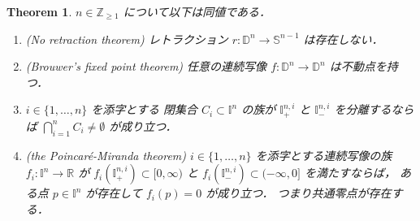 \documentclass[leqno, a4paper, 12pt]{jsarticle}
\theoremstyle{plain}
\newtheorem{thm}{Theorem}[section]
\theoremstyle{definition}
\theoremstyle{remark}
\newcommand{\zz}{\mathbb{Z}}
\newcommand{\rr}{\mathbb{R}}
\newcommand{\yospfont}[1]{\mathbb{#1}}
\newcommand{\yodisc}[1]{\yospfont{D}^{#1}}
\newcommand{\yosphere}[1]{\yospfont{S}^{#1}}
\newcommand{\yocube}[1]{\yospfont{I}^{#1}}
\newcommand{\yocubesidep}[2]{\yospfont{I}^{#1, #2}_{+}}
\newcommand{\yocubesidem}[2]{\yospfont{I}^{#1, #2}_{-}}
\numberwithin{equation}{section}
\begin{document}
\begin{thm}\label{thm:sum:douchifixedpoint}
$n\in \zz_{\ge 1}$
について以下は同値である．
\begin{enumerate}[label=\textup{(\arabic*)}]

\item\label{item:noret}(No retraction theorem)
レトラクション
$r\colon \yodisc{n}\to \yosphere{n-1}$
は存在しない．

\item\label{item:fixedpt}(Brouwer's fixed point theorem)
任意の連続写像
$f\colon \yodisc{n}\to \yodisc{n}$
は不動点を持つ．

\item\label{item:ccc}
$i\in \{1, \dots, n\}$
を添字とする
閉集合
$C_{i}\subset \yocube{n}$
の族が
$\yocubesidep{n}{i}$
と
$\yocubesidem{n}{i}$
を分離するならば
$\bigcap_{i=1}^{n}C_{i}\neq \emptyset$
が成り立つ．


\item\label{item:pm}(the Poincar\'{e}-Miranda theorem)
$i\in \{1, \dots, n\}$
を添字とする連続写像の族
$f_{i}\colon \yocube{n}\to \rr$
が
$f_{i}(\yocubesidep{n}{i})\subset [0, \infty)$
と
$f_{i}(\yocubesidem{n}{i})\subset (-\infty, 0]$
を満たすならば，
ある点
$p\in \yocube{n}$
が存在して
$f_{i}(p)=0$
が成り立つ．
つまり共通零点が存在する．
\end{enumerate}
\end{thm}
\end{document}
